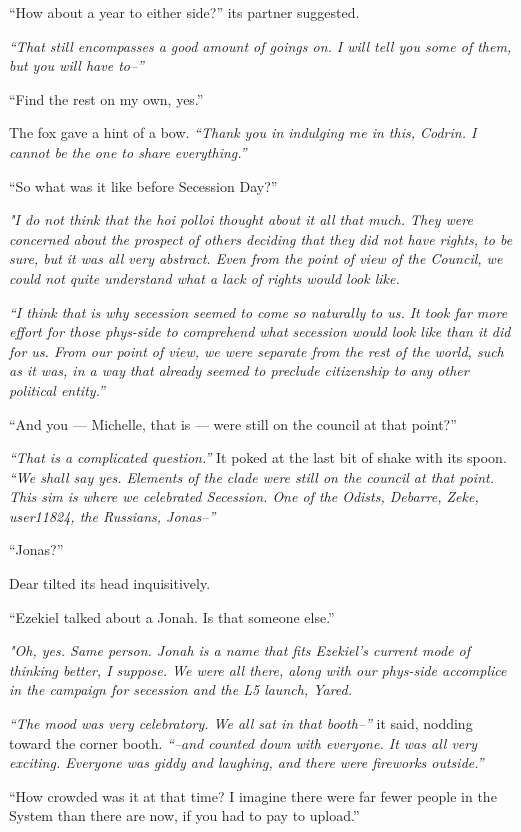 ``How about a year to either side?'' its partner suggested.

\emph{``That still encompasses a good amount of goings on. I will tell you some of them, but you will have to--''}

``Find the rest on my own, yes.''

The fox gave a hint of a bow. \emph{``Thank you in indulging me in this, Codrin. I cannot be the one to share everything.''}

``So what was it like before Secession Day?''

\emph{"I do not think that the hoi polloi thought about it all that much. They were concerned about the prospect of others deciding that they did not have rights, to be sure, but it was all very abstract. Even from the point of view of the Council, we could not quite understand what a lack of rights would look like.}

\emph{``I think that is why secession seemed to come so naturally to us. It took far more effort for those phys-side to comprehend what secession would look like than it did for us. From our point of view, we were separate from the rest of the world, such as it was, in a way that already seemed to preclude citizenship to any other political entity.''}

``And you — Michelle, that is — were still on the council at that point?''

\emph{``That is a complicated question.''} It poked at the last bit of shake with its spoon. \emph{``We shall say yes. Elements of the clade were still on the council at that point. This sim is where we celebrated Secession. One of the Odists, Debarre, Zeke, user11824, the Russians, Jonas--''}

``Jonas?''

Dear tilted its head inquisitively.

``Ezekiel talked about a Jonah. Is that someone else.''

\emph{"Oh, yes. Same person. Jonah is a name that fits Ezekiel's current mode of thinking better, I suppose. We were all there, along with our phys-side accomplice in the campaign for secession and the L5 launch, Yared.}

\emph{``The mood was very celebratory. We all sat in that booth--''} it said, nodding toward the corner booth. \emph{``--and counted down with everyone. It was all very exciting. Everyone was giddy and laughing, and there were fireworks outside.''}

``How crowded was it at that time? I imagine there were far fewer people in the System than there are now, if you had to pay to upload.''

